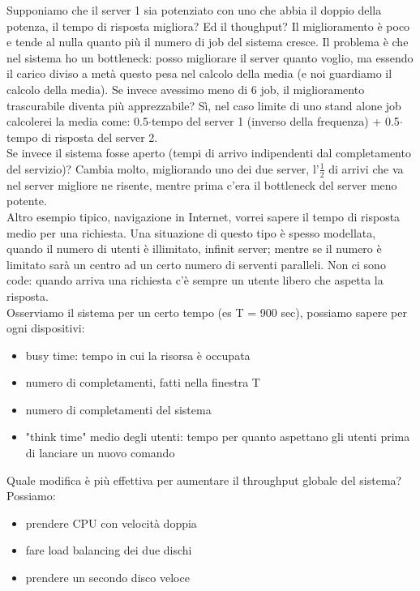 \documentclass{article}
\begin{document}
Supponiamo che il server 1 sia potenziato con uno che abbia il doppio della potenza, il tempo di risposta migliora? Ed il thoughput? Il miglioramento è poco e tende al nulla quanto più il numero di job del sistema cresce. Il problema è che nel sistema ho un bottleneck: posso migliorare il server quanto voglio, ma essendo il carico diviso a metà questo pesa nel calcolo della media (e noi guardiamo il calcolo della media). Se invece avessimo meno di 6 job, il miglioramento trascurabile diventa più apprezzabile? Sì, nel caso limite di uno stand alone job calcolerei la media come: 0.5$\cdot$tempo del server 1 (inverso della frequenza) + 0.5$\cdot$tempo di risposta del server 2.\\ Se invece il sistema fosse aperto (tempi di arrivo indipendenti dal completamento del servizio)? Cambia molto, migliorando uno dei due server, l'$\frac{1}{2}$ di arrivi che va nel server migliore ne risente, mentre prima c'era il bottleneck del server meno potente.\\ Altro esempio tipico, navigazione in Internet, vorrei sapere il tempo di risposta medio per una richiesta. Una situazione di questo tipo è spesso modellata, quando il numero di utenti è illimitato, infinit server; mentre se il numero è limitato sarà un centro ad un certo numero di serventi paralleli. Non ci sono code: quando arriva una richiesta c'è sempre un utente libero che aspetta la risposta.\\
Osserviamo il sistema per un certo tempo (es T = 900 sec), possiamo sapere per ogni dispositivi:
\begin{itemize}
\item busy time: tempo in cui la risorsa è occupata
\item numero di completamenti, fatti nella finestra T
\item numero di completamenti del sistema
\item "think time" medio degli utenti: tempo per quanto aspettano gli utenti prima di lanciare un nuovo comando
\end{itemize}
Quale modifica è più effettiva per aumentare il throughput globale del sistema? Possiamo:
\begin{itemize}
\item prendere CPU con velocità doppia
\item fare load balancing dei due dischi
\item prendere un secondo disco veloce
\end{itemize}
\end{document}
